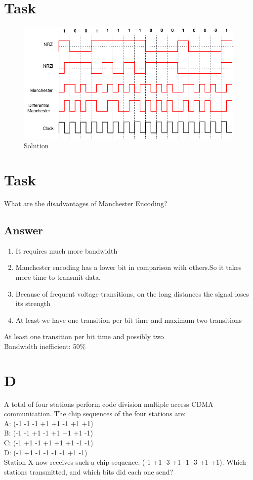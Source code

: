 \documentclass[11pt]{article}
\begin{document}
    \section{Task}
    \begin{figure}[htp]
		\centering
		\includegraphics[width=12cm]{figs/Signals}
		\caption{Solution}
	\end{figure}

    \section{Task}
        What are the disadvantages of Manchester Encoding?

    \subsection{Answer}
        \begin{enumerate}
            \item It requires much more bandwidth
            \item Manchester encoding has a lower bit in comparison with others.So it takes more time to transmit data.
            \item Because of frequent voltage transitions, on the long distances the signal loses its strength
            \item At least we have one transition per bit time and maximum two transitions
        \end{enumerate}


        At least one transition per bit time and possibly two \\
        Bandwidth inefficient: 50\% \\

    \section{D}
        A total of four stations perform code division multiple access CDMA communication.
        The chip sequences of the four stations are: \\
            A: (-1 -1 -1 +1 +1 -1 +1 +1) \\
            B: (-1 -1 +1 -1 +1 +1 +1 -1) \\
            C: (-1 +1 -1 +1 +1 +1 -1 -1) \\
            D: (-1 +1 -1 -1 -1 -1 +1 -1) \\
        Station X now receives such a chip sequence: (-1 +1 -3 +1 -1 -3 +1 +1).
        Which stations transmitted, and which bits did each one send?
\end{document}
